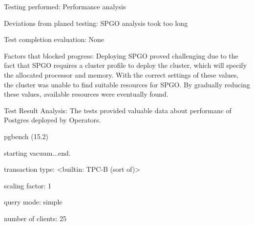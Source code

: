 

Testing performed: Performance analysis

Deviations from planed testing: SPGO analysis took too long

Test completion evaluation: None

Factors that blocked progress: Deploying SPGO proved challenging due to the fact that SPGO requires a cluster profile to deploy the cluster, which will specify the allocated processor and memory. With the correct settings of these values, the cluster was unable to find suitable resources for SPGO. By gradually reducing these values, available resources were eventually found.

Test Result Analysis: The tests provided valuable data about performanc of Postgres deployed by Operators.

pgbench (15.2)

starting vacuum...end.

transaction type: <builtin: TPC-B (sort of)>

scaling factor: 1

query mode: simple

number of clients: 25

